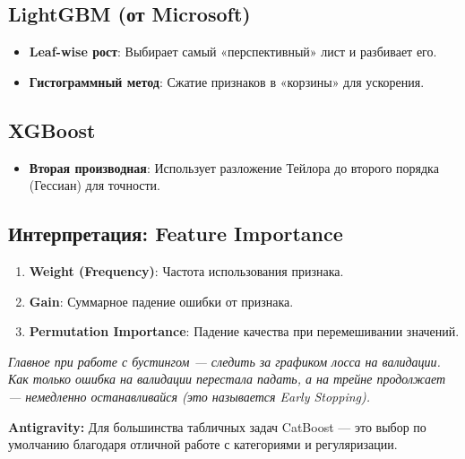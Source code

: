 \documentclass[12pt]{article}
\newcommand{\commentary}[1]{{\small\itshape\color{commentgray} #1}}
\newcommand{\antigravity}[1]{{\small\color{antigravityblue}\textbf{Antigravity:} #1}}
\begin{document}
\subsection{LightGBM (от Microsoft)}
\begin{itemize}
    \item \textbf{Leaf-wise рост}: Выбирает самый «перспективный» лист и разбивает его.
    \item \textbf{Гистограммный метод}: Сжатие признаков в «корзины» для ускорения.
\end{itemize}

\subsection{XGBoost}
\begin{itemize}
    \item \textbf{Вторая производная}: Использует разложение Тейлора до второго порядка (Гессиан) для точности.
\end{itemize}

\subsection{Интерпретация: Feature Importance}
\begin{enumerate}
    \item \textbf{Weight (Frequency)}: Частота использования признака.
    \item \textbf{Gain}: Суммарное падение ошибки от признака.
    \item \textbf{Permutation Importance}: Падение качества при перемешивании значений.
\end{enumerate}

\vspace{1cm}
\commentary{Главное при работе с бустингом — следить за графиком лосса на валидации. Как только ошибка на валидации перестала падать, а на трейне продолжает — немедленно останавливайся (это называется Early Stopping).}

\antigravity{Для большинства табличных задач CatBoost — это выбор по умолчанию благодаря отличной работе с категориями и регуляризации.}
\end{document}
